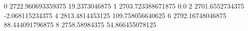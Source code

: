 0 2722.960693359375 19.2373046875
1 2703.723388671875 0.0
2 2701.6552734375 -2.068115234375
4 2813.4814453125 109.758056640625
6 2792.16748046875 88.444091796875
8 2758.58984375 54.866455078125
